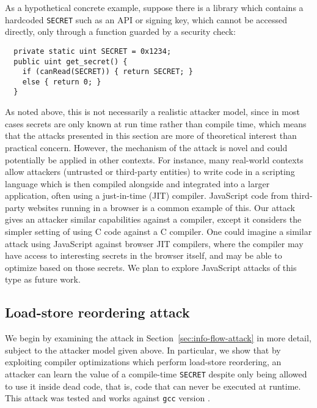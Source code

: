 As a hypothetical concrete example, suppose there is a library which contains
a hardcoded \verb|SECRET| such as an API or signing key, which cannot be accessed
directly, only through a function guarded by a security check:
\begin{verbatim}
  private static uint SECRET = 0x1234;
  public uint get_secret() {
    if (canRead(SECRET)) { return SECRET; }
    else { return 0; }
  }
\end{verbatim}
As noted above, this is not necessarily a realistic attacker model,
since in most cases secrets are only known at run time rather than compile time,
which means that the attacks presented in this section
are more of theoretical interest than practical concern.
However, the mechanism of the attack is novel and could potentially be applied
in other contexts.
For instance, many real-world contexts allow attackers (untrusted or
third-party entities) to write code in a scripting language which is then
compiled alongside and integrated into a larger application, often
using a just-in-time (JIT) compiler.
JavaScript code from third-party websites running in a browser is a common
example of this.
Our attack gives an attacker similar capabilities against a
compiler, except it considers the simpler setting of using C code against a C
compiler.
One could imagine a similar attack using JavaScript against browser JIT
compilers, where the compiler may have access to interesting secrets in the
browser itself, and may be able to optimize based on those secrets.
We plan to explore JavaScript attacks of this type as future work.

\subsection{Load-store reordering attack}
\label{subsec:exp-rel-mem}

We begin by examining the attack in Section~\ref{sec:info-flow-attack} in
more detail, subject to the attacker model given above.
In particular, we show that by exploiting compiler optimizations which perform
load-store reordering, an attacker can learn the value of a compile-time
\verb|SECRET| despite only being allowed to use it inside dead code, that is,
code that can never be executed at runtime.
This attack was tested and works against \verb|gcc| version .

